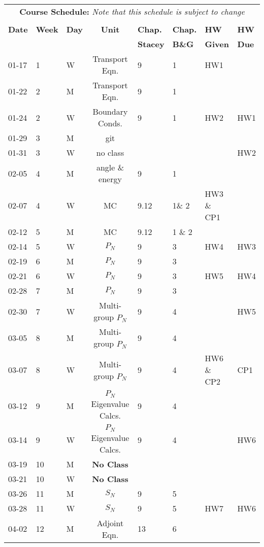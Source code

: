 \documentclass[11pt, a4paper]{article}
\begin{document}
\pagebreak
\FloatBarrier
\renewcommand{\arraystretch}{1}
\begin{table}[h]
\begin{center}
\begin{tabular}{lllcllll}
\multicolumn{8}{c}{\textbf{Course Schedule:}\textit{ Note that this schedule is subject to change}}\\
&&&&&&&\\
\textbf{Date} & \textbf{Week} & \textbf{Day} & \textbf{Unit} & \textbf{Chap.} & \textbf{Chap.} & \textbf{HW} & \textbf{HW}\\
              &  &  & & \textbf{Stacey}& \textbf{B\&G} & \textbf{Given} & \textbf{Due}\\
\hline
\hline
01-17 & 1 & W & Transport Eqn. & 9 & 1 & HW1 & \\
01-22 & 2 & M & Transport Eqn. & 9 & 1 &  & \\
01-24 & 2 & W & Boundary Conds. & 9 & 1 & HW2 & HW1\\
01-29 & 3 & M & git &  &  &  & \\
01-31 & 3 & W & no class &  &  &  & HW2\\
02-05 & 4 & M & angle \& energy & 9 & 1 &  & \\
02-07 & 4 & W & MC    & 9.12 & 1\& 2 & HW3 \& CP1 & \\
02-12 & 5 & M & MC & 9.12 & 1 \& 2 &  & \\
02-14 & 5 & W & $P_N$ & 9 & 3 & HW4 & HW3\\
02-19 & 6 & M & $P_N$ & 9 & 3 &  & \\
02-21 & 6 & W & $P_N$ & 9 & 3 & HW5 & HW4\\
02-28 & 7 & M & $P_N$ & 9 & 3 &  & \\
02-30 & 7 & W & Multi-group $P_N$ & 9 & 4 &     & HW5\\
03-05 & 8 & M & Multi-group $P_N$ & 9 & 4 &  & \\
03-07 & 8 & W & Multi-group $P_N$ & 9 & 4 & HW6 \& CP2 & CP1\\
03-12 & 9 & M & $P_N$ Eigenvalue Calcs.& 9 & 4 &  &   \\
03-14 & 9 & W & $P_N$ Eigenvalue Calcs. & 9 & 4 &      & HW6\\
03-19 & 10 & M & \textbf{No Class} &  &  &  & \\
03-21 & 10 & W & \textbf{No Class} &  &  &  & \\
03-26 & 11 & M & $S_N$ & 9 & 5 &     &    \\
03-28 & 11 & W & $S_N$ & 9 & 5 & HW7 & HW6 \\
04-02 & 12 & M & Adjoint Eqn. & 13 & 6 &  & \\

\end{tabular}
\end{center}
\end{table}
\end{document}
